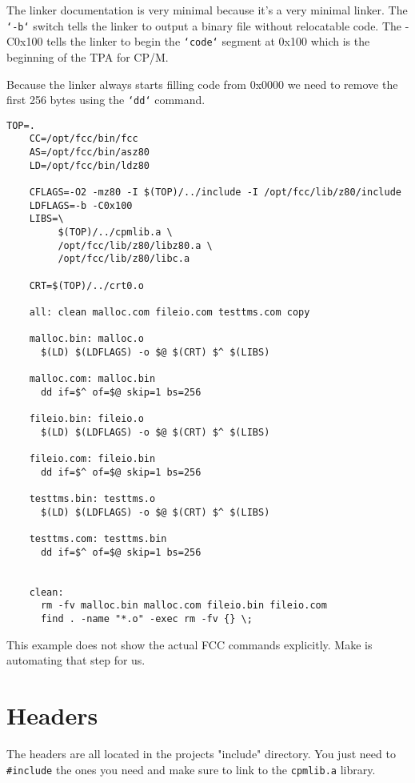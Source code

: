 \documentclass[10pt,a4paper,hidelinks]{article}
\begin{document}
The linker documentation is very minimal because it's a very minimal linker.
The \texttt{`-b`} switch tells the linker to output a binary file without
relocatable code.  The -C0x100 tells the linker to begin the \texttt{`code`}
segment at 0x100 which is the beginning of the TPA for CP/M.

Because the linker always starts filling code from 0x0000 we need to remove the
first 256 bytes using the \texttt{`dd`} command.
\pagebreak

\begin{center}
  \begin{lstlisting}[caption=Example Makefile]
    TOP=.
    CC=/opt/fcc/bin/fcc
    AS=/opt/fcc/bin/asz80
    LD=/opt/fcc/bin/ldz80

    CFLAGS=-O2 -mz80 -I $(TOP)/../include -I /opt/fcc/lib/z80/include
    LDFLAGS=-b -C0x100
    LIBS=\
         $(TOP)/../cpmlib.a \
         /opt/fcc/lib/z80/libz80.a \
         /opt/fcc/lib/z80/libc.a

    CRT=$(TOP)/../crt0.o

    all: clean malloc.com fileio.com testtms.com copy

    malloc.bin: malloc.o
      $(LD) $(LDFLAGS) -o $@ $(CRT) $^ $(LIBS)

    malloc.com: malloc.bin
      dd if=$^ of=$@ skip=1 bs=256

    fileio.bin: fileio.o
      $(LD) $(LDFLAGS) -o $@ $(CRT) $^ $(LIBS)

    fileio.com: fileio.bin
      dd if=$^ of=$@ skip=1 bs=256

    testtms.bin: testtms.o
      $(LD) $(LDFLAGS) -o $@ $(CRT) $^ $(LIBS)

    testtms.com: testtms.bin
      dd if=$^ of=$@ skip=1 bs=256


    clean:
      rm -fv malloc.bin malloc.com fileio.bin fileio.com
      find . -name "*.o" -exec rm -fv {} \;
  \end{lstlisting}
\end{center}
\label{lst:makefile}

This example does not show the actual FCC commands explicitly.  Make is
automating that step for us.
\pagebreak

\section{Headers}

The headers are all located in the projects "include" directory.  You just need
to \texttt{\#include} the ones you need and make sure to link to the
\texttt{cpmlib.a} library.
\end{document}
